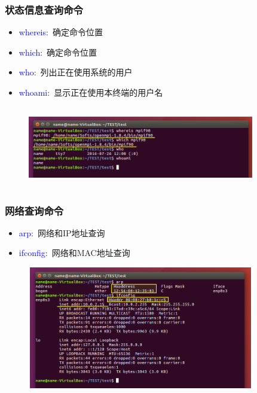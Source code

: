 \frame
{
	\frametitle{状态信息查询命令}
	\begin{itemize}
		\item \textcolor{blue}{whereis}:~确定命令位置
		\item \textcolor{blue}{which}:~确定命令位置
		\item \textcolor{blue}{who}:~列出正在使用系统的用户
		\item \textcolor{blue}{whoami}:~显示正在使用本终端的用户名
	\end{itemize}
\begin{figure}[h!]
\centering
\vspace{-5.5pt}
\includegraphics[height=1.4in,width=3.9in,viewport=0 30 800 300,clip]{Figures/Ubuntu-which.png}
\label{Linux-command-which}
\end{figure}
}

\frame
{
	\frametitle{网络查询命令}
	\begin{itemize}
		\item \textcolor{blue}{arp}:~网络和\textrm{IP}地址查询
		\item \textcolor{blue}{ifconfig}:~网络和\textrm{MAC}地址查询
	\end{itemize}
\begin{figure}[h!]
\centering
\vspace{-5.5pt}
\includegraphics[height=2.1in,width=3.9in,viewport=0 0 800 470,clip]{Figures/Ubuntu-netip.png}
\label{Linux-command-netip}
\end{figure}
}

